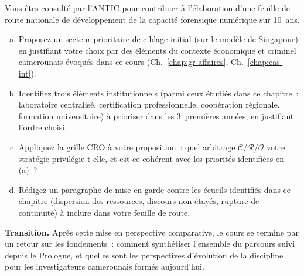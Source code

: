 \begin{boxexo}[title={\ding{45}\quad Exercice~24.3 --- Stratégie nationale argumentée \niveauexpert}]
Vous êtes consulté par l'ANTIC pour contribuer à l'élaboration
d'une feuille de route nationale de développement de la capacité
forensique numérique sur 10~ans.
\begin{enumerate}[(a)]
    \item Proposez un secteur prioritaire de ciblage initial
          (sur le modèle de Singapour) en justifiant votre choix
          par des éléments du contexte économique et criminel
          camerounais évoqués dans ce cours (Ch.~\ref{chap:gr-affaires},
          Ch.~\ref{chap:cas-int}).
    \item Identifiez trois éléments institutionnels (parmi ceux
          étudiés dans ce chapitre~: laboratoire centralisé,
          certification professionnelle, coopération régionale,
          formation universitaire) à prioriser dans les
          3~premières années, en justifiant l'ordre choisi.
    \item Appliquez la grille CRO à votre proposition~: quel
          arbitrage $\mathcal{C}$/$\mathcal{R}$/$\mathcal{O}$
          votre stratégie privilégie-t-elle, et est-ce cohérent
          avec les priorités identifiées en (a)~?
    \item Rédigez un paragraphe de mise en garde contre les
          écueils identifiés dans ce chapitre (dispersion des
          ressources, discours non étayés, rupture de continuité)
          à inclure dans votre feuille de route.
\end{enumerate}
\end{boxexo}

\bigskip

\begin{boxinfo}
\textbf{Transition.} Après cette mise en perspective comparative,
le cours se termine par un retour sur les fondements~: comment
synthétiser l'ensemble du parcours suivi depuis le Prologue, et
quelles sont les perspectives d'évolution de la discipline pour
les investigateurs camerounais formés aujourd'hui.
\end{boxinfo}